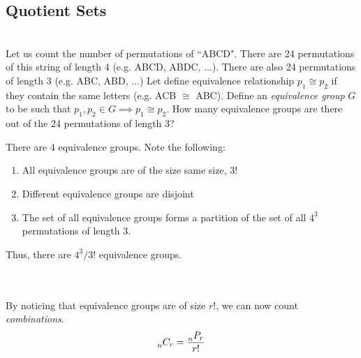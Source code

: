 \subsection{Quotient Sets}
\begin{problem}\\
Let us count the number of permutations of ``ABCD". There are 24 permutations of this string of length 4 (e.g. ABCD, ABDC, ...). There are also 24 permutations of length 3 (e.g. ABC, ABD, ...) Let define equivalence relationship $p_1 \cong p_2$ if they contain the same letters (e.g. ACB $\cong$ ABC). Define an \emph{equivalence group} $G$ to be such that $p_1, p_2 \in G \implies p_1 \cong p_2$.
How many equivalence groups are there out of the 24 permutations of length 3?
\end{problem}
\begin{solution}
There are 4 equivalence groups. Note the following:
\begin{enumerate}
    \item All equivalence groups are of the size same size, 3!
    \item Different equivalence groups are disjoint
    \item The set of all equivalence groups forms a partition of the set of all $4^{\underline{3}}$ permutations of length 3.
\end{enumerate}
Thus, there are $4^{\underline{3}}/3!$ equivalence groups.
\end{solution} \\ \\
By noticing that equivalence groups are of size $r!$, we can now count \emph{combinations}.
\[
\prescript{}{n}{C_r} = \frac{\prescript{}{n}{P_r}}{r!}
\]
% 